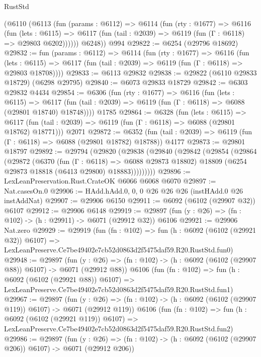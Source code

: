 \begin{lexlean}{RustStd}
\begin{coremodule}
      (@6110
        (@6113
          (fun (params : @6112) =>
          @6114
            (fun (rty : @1677) =>
            @6116
              (fun (lets : @6115) =>
              @6117 (fun (tail : @2039) => @6119 (fun (Γ : @6118) => @29803 @6202))))))
        @6248))
    @994
@29822 := @6254 (@29796 @18692)
@29832 := fun (params : @6112) =>
  @6114
    (fun (rty : @1677) =>
    @6116
      (fun (lets : @6115) =>
      @6117 (fun (tail : @2039) => @6119 (fun (Γ : @6118) => @29803 @18708))))
@29833 := @6113 @29832
@29838 := @29822 (@6110 @29833 @18729) (@6298 @29795)
@29840 := @6073 @29833 @18729
@29842 := @6303 @29832 @4434
@29854 := @6306
    (fun (rty : @1677) =>
    @6116
      (fun (lets : @6115) =>
      @6117 (fun (tail : @2039) => @6119 (fun (Γ : @6118) => @6088 (@29801 @18740) @18748))))
    @1785
@29864 := @6328
    (fun (lets : @6115) =>
    @6117 (fun (tail : @2039) => @6119 (fun (Γ : @6118) => @6088 (@29801 @18762) @18771)))
    @2071
@29872 := @6352
    (fun (tail : @2039) => @6119 (fun (Γ : @6118) => @6088 (@29801 @18782) @18788))
    @4177
@29873 := @29801 @18797
@29892 := @29794
    (@29820
      (@29838
        (@29840
          (@29842
            (@29854
              (@29864
                (@29872
                  (@6370
                    (fun (Γ : @6118) => @6088 @29873 @18802)
                    @18809
                    (@6254 @29873 @18818 (@6413 @29800) @18883)))))))))
@29896 := LexLeanPreservation.Rust.CrateOK @6066 @6068 @6070
@29897 := Nat.casesOn.{0}
@29906 := HAdd.hAdd.{0, 0, 0} @26 @26 @26 (instHAdd.{0} @26 instAddNat)
@29907 := @29906 @6150
@29911 := @6092 (@6102 (@29907 @32)) @6107
@29912 := @29906 @6148
@29919 := @29897 (fun (y : @26) => (fn : @102) -> (h : @29911) -> @6071 (@29912 @32)) @6106
@29921 := @29906 Nat.zero
@29929 := @29919
    (fun (fn : @102) =>
    fun (h : @6092 (@6102 (@29921 @32)) @6107) =>
    LexLeanPreserve.Ce7be49402e7cb52d0863d2f5475daf59.R20.RustStd.fun0)
@29948 := @29897
    (fun (y : @26) => (fn : @102) -> (h : @6092 (@6102 (@29907 @88)) @6107) -> @6071 (@29912 @88))
    @6106
    (fun (fn : @102) =>
    fun (h : @6092 (@6102 (@29921 @88)) @6107) =>
    LexLeanPreserve.Ce7be49402e7cb52d0863d2f5475daf59.R20.RustStd.fun1)
@29967 := @29897
    (fun (y : @26) => (fn : @102) -> (h : @6092 (@6102 (@29907 @119)) @6107) -> @6071 (@29912 @119))
    @6106
    (fun (fn : @102) =>
    fun (h : @6092 (@6102 (@29921 @119)) @6107) =>
    LexLeanPreserve.Ce7be49402e7cb52d0863d2f5475daf59.R20.RustStd.fun2)
@29986 := @29897
    (fun (y : @26) => (fn : @102) -> (h : @6092 (@6102 (@29907 @206)) @6107) -> @6071 (@29912 @206))

\end{coremodule}
\end{lexlean}
